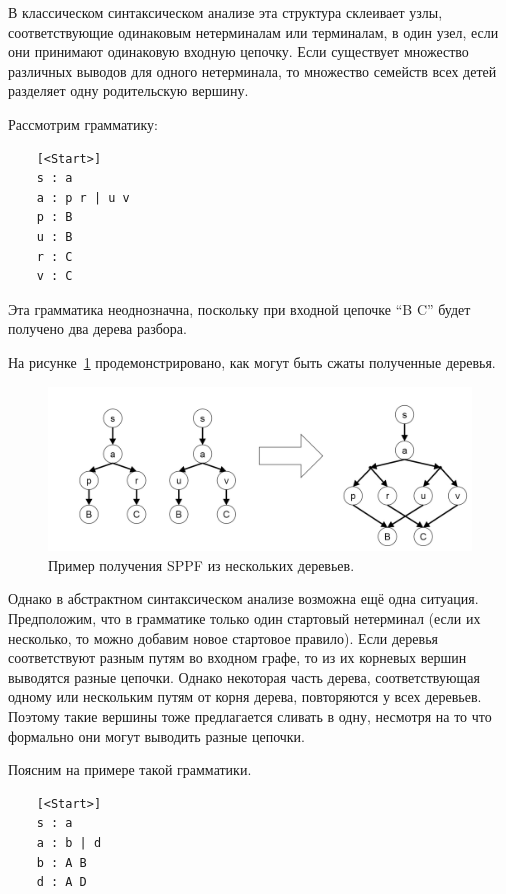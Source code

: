 В классическом синтаксическом анализе эта структура склеивает узлы, соответствующие одинаковым нетерминалам или терминалам, в один  узел, если они принимают одинаковую входную цепочку. Если существует множество различных выводов для одного нетерминала, то множество семейств всех детей разделяет одну родительскую вершину. 

Рассмотрим грамматику: 

\begin{verbatim}
    [<Start>]
    s : a 
    a : p r | u v
    p : B
    u : B
    r : C
    v : C
\end{verbatim}

Эта грамматика неоднозначна, поскольку при входной цепочке ``B C'' будет получено два дерева разбора. 

На рисунке~\ref{sppf_idea} продемонстрировано, как могут быть сжаты полученные деревья.

\begin{figure}[t]
\centering
\includegraphics[width=\linewidth]{Ivanov/Pictures/sppf.png}
\caption{Пример получения SPPF из нескольких деревьев.}
\label{sppf_idea}
\end{figure}

Однако в абстрактном синтаксическом анализе возможна ещё одна ситуация. Предположим, что в грамматике только один стартовый нетерминал (если их несколько, то можно добавим новое стартовое правило). Если деревья соответствуют разным путям во входном графе, то из их корневых вершин выводятся разные цепочки. Однако некоторая часть дерева, соответствующая одному или нескольким путям от корня дерева, повторяются у всех деревьев. Поэтому такие вершины тоже предлагается сливать в одну, несмотря на то что формально они могут выводить разные цепочки. 

Поясним на примере такой грамматики.

\begin{verbatim}
    [<Start>] 
    s : a 
    a : b | d 
    b : A B
    d : A D 
\end{verbatim}

